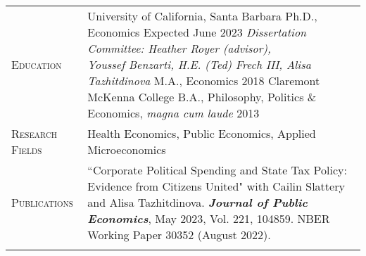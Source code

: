 \documentclass[11pt]{article}
\newcommand{\xspace}{19pt}
\begin{document}
\begin{tabularx}{\textwidth}{@{}Y Z@{}}
	\textsc{Education} &
	University of California, Santa Barbara
	\vspace{3pt} \newline
	\hspace*{20pt} Ph.D., Economics \hfill Expected June 2023%
	\vspace{3pt} \newline
	\hspace*{20pt} \textit{Dissertation Committee: Heather Royer (advisor), \newline \hspace*{20pt} Youssef Benzarti, H.E. (Ted) Frech III, Alisa Tazhitdinova} 
	\vspace{3pt} \newline
	\hspace*{20pt} M.A., Economics \hfill 2018%
	\vspace{10pt} \newline
	Claremont McKenna College
	\vspace{3pt} \newline
	\hspace*{20pt} B.A., Philosophy, Politics \& Economics, \textit{magna cum laude} \hfill 2013%
    \\  \addlinespace[\xspace] 

	\textsc{Research Fields} & 
	Health Economics, Public Economics, Applied Microeconomics
	\\ \addlinespace[\xspace] 

	\textsc{Publications} & 
	``Corporate Political Spending and State Tax Policy: Evidence from Citizens United" \newline with Cailin Slattery and Alisa Tazhitdinova. \textbf{\textit{Journal of Public Economics}}, \newline May 2023, Vol. 221, 104859. NBER Working Paper 30352 (August 2022).
	\\ \addlinespace[\xspace] 
	

\end{tabularx}
\end{document}
